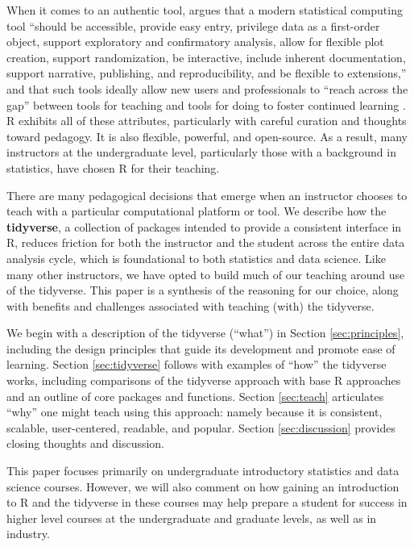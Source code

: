 \documentclass[12pt]{article}
\begin{document}
When it comes to an authentic tool, \citet{mcna_2019} argues that a
modern statistical computing tool ``should be accessible, provide easy
entry, privilege data as a first-order object, support exploratory and
confirmatory analysis, allow for flexible plot creation, support
randomization, be interactive, include inherent documentation, support
narrative, publishing, and reproducibility, and be flexible to
extensions,'' and that such tools ideally allow new users and
professionals to ``reach across the gap'' between tools for teaching and
tools for doing to foster continued learning
\citep{mcnamara2015, mcna_2019}. R exhibits all of these attributes,
particularly with careful curation and thoughts toward pedagogy. It is
also flexible, powerful, and open-source. As a result, many instructors
at the undergraduate level, particularly those with a background in
statistics, have chosen R \citep{Rlang} for their teaching.

There are many pedagogical decisions that emerge when an instructor
chooses to teach with a particular computational platform or tool. We
describe how the \textbf{tidyverse}, a collection of packages intended
to provide a consistent interface in R, reduces friction for both the
instructor and the student across the entire data analysis cycle, which
is foundational to both statistics and data science. Like many other
instructors, we have opted to build much of our teaching around use of
the tidyverse. This paper is a synthesis of the reasoning for our
choice, along with benefits and challenges associated with teaching
(with) the tidyverse.

We begin with a description of the tidyverse (``what'') in Section
\ref{sec:principles}, including the design principles that guide its
development and promote ease of learning. Section \ref{sec:tidyverse}
follows with examples of ``how'' the tidyverse works, including
comparisons of the tidyverse approach with base R approaches and an
outline of core packages and functions. Section \ref{sec:teach}
articulates ``why'' one might teach using this approach: namely because
it is consistent, scalable, user-centered, readable, and popular.
Section \ref{sec:discussion} provides closing thoughts and discussion.

This paper focuses primarily on undergraduate introductory statistics
and data science courses. However, we will also comment on how gaining
an introduction to R and the tidyverse in these courses may help prepare
a student for success in higher level courses at the undergraduate and
graduate levels, as well as in industry.
\end{document}
